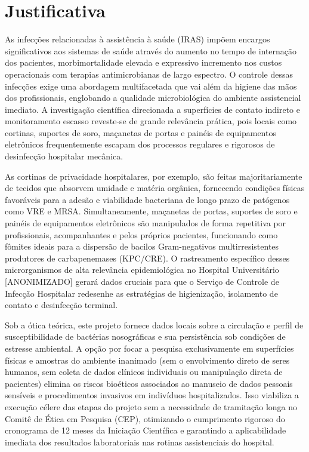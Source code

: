 \documentclass[12pt,a4paper]{article}
\begin{document}
\section{Justificativa}
As infecções relacionadas à assistência à saúde (IRAS) impõem encargos significativos aos sistemas de saúde através do aumento no tempo de internação dos pacientes, morbimortalidade elevada e expressivo incremento nos custos operacionais com terapias antimicrobianas de largo espectro. O controle dessas infecções exige uma abordagem multifacetada que vai além da higiene das mãos dos profissionais, englobando a qualidade microbiológica do ambiente assistencial imediato. A investigação científica direcionada a superfícies de contato indireto e monitoramento escasso reveste-se de grande relevância prática, pois locais como cortinas, suportes de soro, maçanetas de portas e painéis de equipamentos eletrônicos frequentemente escapam dos processos regulares e rigorosos de desinfecção hospitalar mecânica.

As cortinas de privacidade hospitalares, por exemplo, são feitas majoritariamente de tecidos que absorvem umidade e matéria orgânica, fornecendo condições físicas favoráveis para a adesão e viabilidade bacteriana de longo prazo de patógenos como VRE e MRSA. Simultaneamente, maçanetas de portas, suportes de soro e painéis de equipamentos eletrônicos são manipulados de forma repetitiva por profissionais, acompanhantes e pelos próprios pacientes, funcionando como fômites ideais para a dispersão de bacilos Gram-negativos multirresistentes produtores de carbapenemases (KPC/CRE). O rastreamento específico desses microrganismos de alta relevância epidemiológica no Hospital Universitário [ANONIMIZADO] gerará dados cruciais para que o Serviço de Controle de Infecção Hospitalar redesenhe as estratégias de higienização, isolamento de contato e desinfecção terminal.

Sob a ótica teórica, este projeto fornece dados locais sobre a circulação e perfil de susceptibilidade de bactérias nosográficas e sua persistência sob condições de estresse ambiental. A opção por focar a pesquisa exclusivamente em superfícies físicas e amostras do ambiente inanimado (sem o envolvimento direto de seres humanos, sem coleta de dados clínicos individuais ou manipulação direta de pacientes) elimina os riscos bioéticos associados ao manuseio de dados pessoais sensíveis e procedimentos invasivos em indivíduos hospitalizados. Isso viabiliza a execução célere das etapas do projeto sem a necessidade de tramitação longa no Comitê de Ética em Pesquisa (CEP), otimizando o cumprimento rigoroso do cronograma de 12 meses da Iniciação Científica e garantindo a aplicabilidade imediata dos resultados laboratoriais nas rotinas assistenciais do hospital.
\newpage
\end{document}
